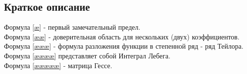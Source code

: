 \documentclass[12pt, a4paper]{article}
\begin{document}
\subsection{Краткое описание}
Формула \ref{æ} - первый замечательный предел. \\
Формула \ref{ææ} - доверительная область для нескольких (двух) коэффициентов.\\
Формула \ref{æææ} - формула разложения функции в степенной ряд - ряд Тейлора.\\
Формула \ref{ææææ} представляет собой Интеграл Лебега.\\
Формула \ref{æææææ} - матрица Гессе.
\end{document}
